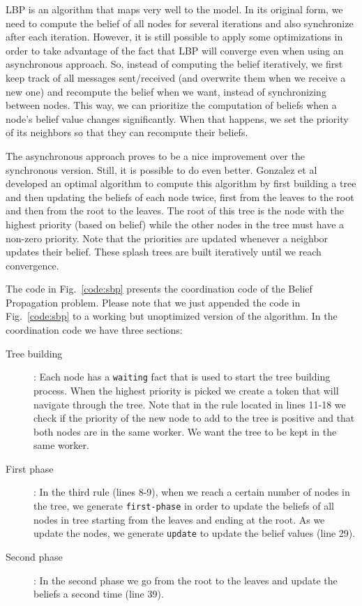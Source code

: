 LBP is an algorithm that maps very well to the \lang model. In its original form, we need to compute
the belief of all nodes for several iterations and also synchronize after each iteration.
However, it is still possible to apply
some optimizations in order to take advantage of the fact that LBP will converge even when using
an asynchronous approach. So, instead of computing the belief iteratively,
we first keep track of all messages sent/received (and overwrite them when we receive a new one)
and recompute the belief when we want, instead of synchronizing between nodes.
This way, we can prioritize the computation of beliefs when
a node's belief value changes significantly. When that happens, we set the priority of its
neighbors so that they can recompute their beliefs.

The asynchronous approach proves to be a nice improvement over the synchronous version. Still, it
is possible to do even better. Gonzalez et al~\cite{Gonzalez+al:aistats09paraml} developed an optimal
algorithm to compute this algorithm by first building a tree and then updating the beliefs of each node twice, first from the leaves to the root and then from the root to the leaves. The root of this tree
is the node with the highest priority (based on belief) while the other nodes in the tree
must have a non-zero priority. Note that the priorities are updated whenever a neighbor updates
their belief. These splash trees are built iteratively until we reach convergence.

The code in Fig.~\ref{code:sbp} presents the coordination code of the Belief Propagation problem.
Please note that we just appended the code in Fig.~\ref{code:sbp} to a working but
unoptimized version of the algorithm.
In the coordination code we have three sections:
\begin{description}
   \item[Tree building]: Each node has a \texttt{waiting} fact that is used to start the tree building process. When the highest priority is picked we create a token that will navigate through the tree. Note that in the rule located in lines 11-18 we check if the priority of the new node to add to the tree is positive and that both nodes are in the same worker. We want the tree to be kept in the same worker.
   \item[First phase]: In the third rule (lines 8-9), when we reach a certain number of nodes in the tree, we generate \texttt{first-phase} in order to update the beliefs of all nodes in tree starting from the leaves and ending at the root. As we update the nodes, we generate \texttt{update} to update the belief values (line 29).
   \item[Second phase]: In the second phase we go from the root to the leaves and update the beliefs a second time (line 39).
\end{description}

